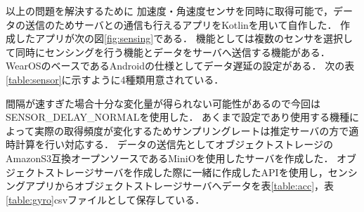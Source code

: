 以上の問題を解決するために
加速度・角速度センサを同時に取得可能で，データの送信のためサーバとの通信も行えるアプリをKotlinを用いて自作した．
作成したアプリが次の図\ref{fig:sensing}である．
機能としては複数のセンサを選択して同時にセンシングを行う機能とデータをサーバへ送信する機能がある．
WearOSのベースであるAndroidの仕様としてデータ遅延の設定がある．
次の表\ref{table:sensor}に示すように4種類用意されている．
\begin{table}[ht]
    \centering
    \caption{センサのデータ遅延設定}
    \label{table:sensor}
\end{table}
間隔が速すぎた場合十分な変化量が得られない可能性があるので今回はSENSOR\_DELAY\_NORMALを使用した．
あくまで設定であり使用する機種によって実際の取得頻度が変化するためサンプリングレートは推定サーバの方で適時計算を行い対応する．
データの送信先としてオブジェクトストレージのAmazonS3互換オープンソースであるMiniOを使用したサーバを作成した．
オブジェクトストレージサーバを作成した際に一緒に作成したAPIを使用し，センシングアプリからオブジェクトストレージサーバへデータを表\ref{table:acc}，表\ref{table:gyro}csvファイルとして保存している．
\begin{table}[ht]
    \centering
    \caption{加速度データの形式の例}
    \label{table:acc}
\end{table}
